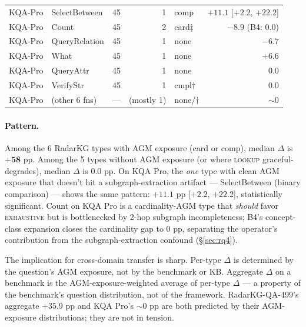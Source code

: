 \documentclass[review]{elsarticle}
\newcommand{\op}[1]{\textsc{\small #1}}
\begin{document}
\begin{table}[t]
\begin{tabular}{l l r r l r}
\midrule
KQA-Pro     & SelectBetween       & 45 &   1  & comp       & $\mathbf{+11.1}$ [$+2.2$, $+22.2$] \\
KQA-Pro     & Count               & 45 &   2  & card$\ddagger$ & $-8.9$ (B4: $0.0$) \\
KQA-Pro     & QueryRelation       & 45 &   1  & none       & $-6.7$ \\
KQA-Pro     & What                & 45 &   1  & none       & $+6.6$ \\
KQA-Pro     & QueryAttr           & 45 &   1  & none       & $0.0$ \\
KQA-Pro     & VerifyStr           & 45 &   1  & cmpl$\dagger$ & $0.0$ \\
KQA-Pro     & (other 6 fns)       & --- & (mostly 1) & none/$\dagger$ & ${\sim}0$ \\
\bottomrule
\end{tabular}
\end{table}

\paragraph{Pattern.}
Among the 6 RadarKG types with AGM exposure (\textsf{card} or \textsf{comp}), median $\Delta$ is $\mathbf{+58}$ pp. Among the 5 types without AGM exposure (or where \op{lookup} graceful-degrades), median $\Delta$ is $\mathbf{0.0}$ pp. On KQA Pro, the \emph{one} type with clean AGM exposure that doesn't hit a subgraph-extraction artifact --- SelectBetween (binary comparison) --- shows the same pattern: $+11.1$ pp [$+2.2$, $+22.2$], statistically significant. Count on KQA Pro is a cardinality-AGM type that \emph{should} favor \op{exhaustive} but is bottlenecked by 2-hop subgraph incompleteness; B4's concept-class expansion closes the cardinality gap to 0 pp, separating the operator's contribution from the subgraph-extraction confound (§\ref{sec:rq4}).

The implication for cross-domain transfer is sharp. Per-type $\Delta$ is determined by the question's AGM exposure, not by the benchmark or KB. Aggregate $\Delta$ on a benchmark is the AGM-exposure-weighted average of per-type $\Delta$ --- a property of the benchmark's question distribution, not of the framework. RadarKG-QA-499's aggregate $+35.9$ pp and KQA Pro's ${\sim}0$ pp are both predicted by their AGM-exposure distributions; they are not in tension.
\end{document}
